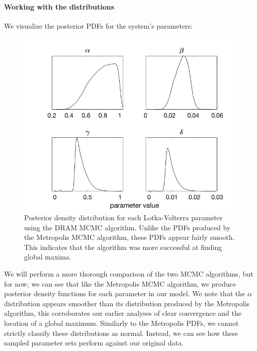 \paragraph{Working with the distributions}
We visualize the posterior PDFs for the system's parameters:
\begin{figure}[H]
    \centering
    \includegraphics[width=15cm]{MCMC_figs/met_lv_final/final_dram_den.png}
    \caption{Posterior density distribution for each Lotka-Volterra parameter using the DRAM MCMC algorithm. Unlike the PDFs produced by the Metropolis MCMC algorithm, these PDFs appear fairly smooth. This indicates that the algorithm was more successful at finding global maxima.}
    \label{fig:9mcmc}
\end{figure}
We will perform a more thorough comparison of the two MCMC algorithms, but for now, we can see that like the Metropolis MCMC algorithm, we produce posterior density functions for each parameter in our model. We note that the $\alpha$ distribution appears smoother than its distribution produced by the Metropolis algorithm, this corroborates our earlier analyses of clear convergence and the location of a global maximum. Similarly to the Metropolis PDFs, we cannot strictly classify these distributions as normal. Instead, we can see how these sampled parameter sets perform against our original data.
